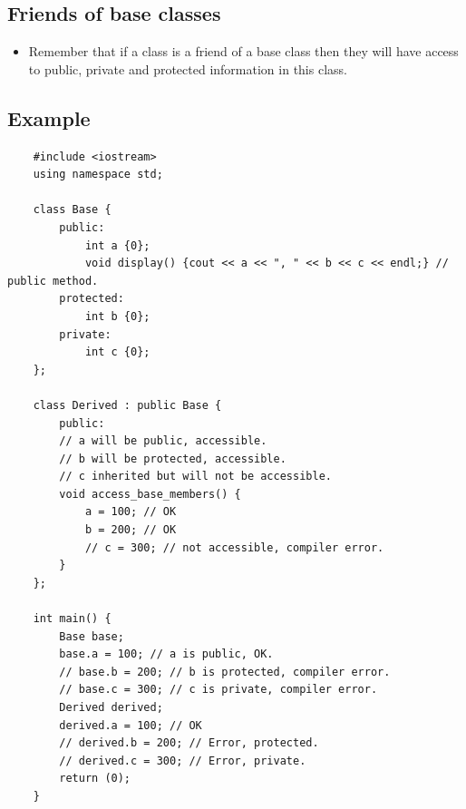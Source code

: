 \subsection{Friends of base classes}
\begin{itemize}
    \item Remember that if a class is a friend of a base class then they will have access to public, private and protected information in this class.
\end{itemize}

\subsection{Example}
\begin{verbatim}
    #include <iostream>
    using namespace std;

    class Base {
        public: 
            int a {0};
            void display() {cout << a << ", " << b << c << endl;} // public method.
        protected:
            int b {0};
        private:
            int c {0};
    };

    class Derived : public Base {
        public:
        // a will be public, accessible.
        // b will be protected, accessible.
        // c inherited but will not be accessible.
        void access_base_members() {
            a = 100; // OK
            b = 200; // OK
            // c = 300; // not accessible, compiler error.
        }   
    };

    int main() {
        Base base;
        base.a = 100; // a is public, OK.
        // base.b = 200; // b is protected, compiler error.
        // base.c = 300; // c is private, compiler error.
        Derived derived;
        derived.a = 100; // OK
        // derived.b = 200; // Error, protected.
        // derived.c = 300; // Error, private.
        return (0);
    }
\end{verbatim}

